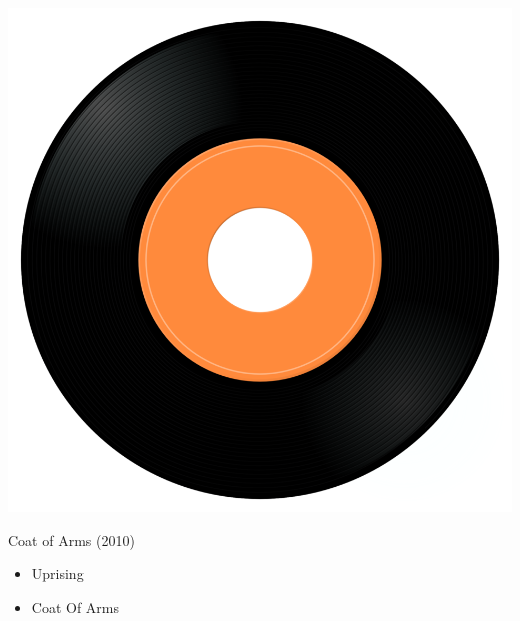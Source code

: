 \begin{minipage}[t]{0.25\textwidth}
\captionsetup{type=figure}
\includegraphics[width=\textwidth]{Images/cover.png}
\caption*{Coat of Arms (2010)}
\end{minipage}
\begin{minipage}[t]{0.25\textwidth}\vspace{0pt}
\begin{itemize}[nosep,leftmargin=1em,labelwidth=*,align=left]
	\setlength{\itemsep}{0pt}
	\item Uprising
	\item Coat Of Arms
\end{itemize}
\end{minipage}
